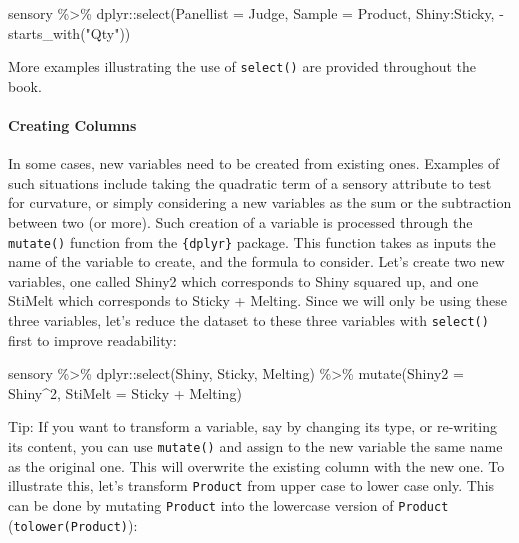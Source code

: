 \documentclass[
]{book}
\newenvironment{Shaded}{\begin{snugshade}}{\end{snugshade}}
\newcommand{\AttributeTok}[1]{\textcolor[rgb]{0.77,0.63,0.00}{#1}}
\newcommand{\DecValTok}[1]{\textcolor[rgb]{0.00,0.00,0.81}{#1}}
\newcommand{\FunctionTok}[1]{\textcolor[rgb]{0.00,0.00,0.00}{#1}}
\newcommand{\NormalTok}[1]{#1}
\newcommand{\SpecialCharTok}[1]{\textcolor[rgb]{0.00,0.00,0.00}{#1}}
\newcommand{\StringTok}[1]{\textcolor[rgb]{0.31,0.60,0.02}{#1}}
\begin{document}
\begin{Shaded}
\begin{Highlighting}[]
\NormalTok{sensory }\SpecialCharTok{\%\textgreater{}\%} 
\NormalTok{  dplyr}\SpecialCharTok{::}\FunctionTok{select}\NormalTok{(}\AttributeTok{Panellist =}\NormalTok{ Judge, }\AttributeTok{Sample =}\NormalTok{ Product, Shiny}\SpecialCharTok{:}\NormalTok{Sticky, }\SpecialCharTok{{-}}\FunctionTok{starts\_with}\NormalTok{(}\StringTok{"Qty"}\NormalTok{))}
\end{Highlighting}
\end{Shaded}

More examples illustrating the use of \texttt{select()} are provided throughout the book.

\hypertarget{creating-columns}{%
\paragraph{Creating Columns}\label{creating-columns}}

In some cases, new variables need to be created from existing ones. Examples of such situations include taking the quadratic term of a sensory attribute to test for curvature, or simply considering a new variables as the sum or the subtraction between two (or more). Such creation of a variable is processed through the \texttt{mutate()} function from the \texttt{\{dplyr\}} package. This function takes as inputs the name of the variable to create, and the formula to consider.
Let's create two new variables, one called Shiny2 which corresponds to Shiny squared up, and one StiMelt which corresponds to Sticky + Melting. Since we will only be using these three variables, let's reduce the dataset to these three variables with \texttt{select()} first to improve readability:

\begin{Shaded}
\begin{Highlighting}[]
\NormalTok{sensory }\SpecialCharTok{\%\textgreater{}\%} 
\NormalTok{  dplyr}\SpecialCharTok{::}\FunctionTok{select}\NormalTok{(Shiny, Sticky, Melting) }\SpecialCharTok{\%\textgreater{}\%} 
  \FunctionTok{mutate}\NormalTok{(}\AttributeTok{Shiny2 =}\NormalTok{ Shiny}\SpecialCharTok{\^{}}\DecValTok{2}\NormalTok{, }\AttributeTok{StiMelt =}\NormalTok{ Sticky }\SpecialCharTok{+}\NormalTok{ Melting)}
\end{Highlighting}
\end{Shaded}

Tip: If you want to transform a variable, say by changing its type, or re-writing its content, you can use \texttt{mutate()} and assign to the new variable the same name as the original one. This will overwrite the existing column with the new one. To illustrate this, let's transform \texttt{Product} from upper case to lower case only. This can be done by mutating \texttt{Product} into the lowercase version of \texttt{Product} (\texttt{tolower(Product)}):
\end{document}
